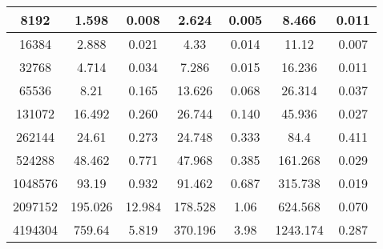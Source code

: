 \documentclass[UTF-8]{article}
\begin{document}
\begin{table}
\begin{tabular}{|c|c|c|c|c|c|c|}
		\hline
		8192    & 1.598        & 0.008         & 2.624           & 0.005             & 8.466          & 0.011            \\ 
		\hline
		16384   & 2.888        & 0.021         & 4.33            & 0.014             & 11.12          & 0.007            \\ 
		\hline
		32768   & 4.714        & 0.034         & 7.286           & 0.015             & 16.236         & 0.011            \\ 
		\hline
		65536   & 8.21         & 0.165         & 13.626          & 0.068             & 26.314         & 0.037            \\ 
		\hline
		131072  & 16.492       & 0.260         & 26.744          & 0.140             & 45.936         & 0.027            \\ 
		\hline
		262144  & 24.61        & 0.273         & 24.748          & 0.333             & 84.4           & 0.411            \\ 
		\hline
		524288  & 48.462       & 0.771         & 47.968          & 0.385             & 161.268        & 0.029            \\ 
		\hline
		1048576 & 93.19        & 0.932         & 91.462          & 0.687             & 315.738        & 0.019            \\ 
		\hline
		2097152 & 195.026      & 12.984        & 178.528         & 1.06              & 624.568        & 0.070            \\ 
		\hline
		4194304 & 759.64       & 5.819         & 370.196         & 3.98              & 1243.174       & 0.287            \\
		\hline
	\end{tabular}
\end{table}
\end{document}

